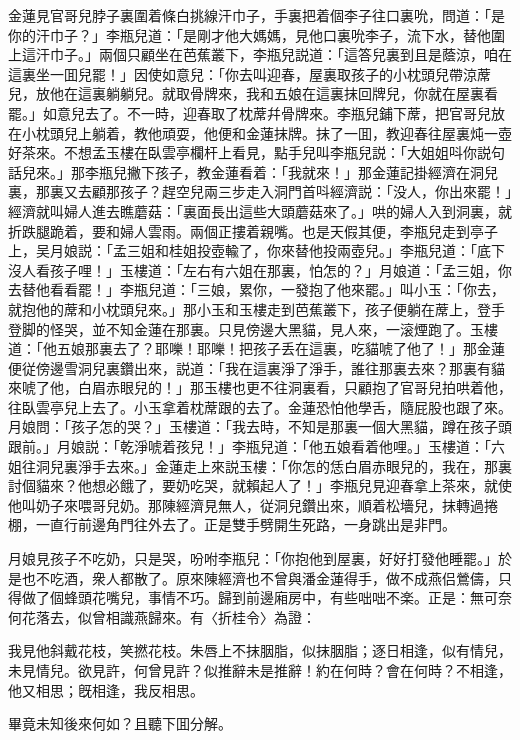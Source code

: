 金蓮見官哥兒脖子裏圍着條白挑線汗巾子，手裏把着個李子往口裏吮，問道：「是你的汗巾子？」李瓶兒道：「是剛才他大媽媽，見他口裏吮李子，流下水，替他圍上這汗巾子。」兩個只顧坐在芭蕉叢下，李瓶兒説道：「這答兒裏到且是蔭涼，咱在這裏坐一囬兒罷！」因使如意兒：「你去叫迎春，屋裏取孩子的小枕頭兒帶涼蓆兒，放他在這裏躺躺兒。就取骨牌來，我和五娘在這裏抹回牌兒，你就在屋裏看罷。」如意兒去了。不一時，迎春取了枕蓆幷骨牌來。李瓶兒鋪下蓆，把官哥兒放在小枕頭兒上躺着，教他頑耍，他便和金蓮抹牌。抹了一囬，教迎春往屋裏炖一壺好茶來。不想孟玉樓在臥雲亭欄杆上看見，點手兒叫李瓶兒説：「大姐姐呌你説句話兒來。」那李瓶兒撇下孩子，教金蓮看着：「我就來！」那金蓮記掛經濟在洞兒裏，那裏又去顧那孩子？趕空兒兩三步走入洞門首呌經濟説：「没人，你出來罷！」經濟就叫婦人進去瞧蘑菇：「裏面長出這些大頭蘑菇來了。」哄的婦人入到洞裏，就折跌腿跪着，要和婦人雲雨。兩個正摟着親嘴。也是天假其便，李瓶兒走到亭子上，吴月娘説：「孟三姐和桂姐投壺輸了，你來替他投兩壺兒。」李瓶兒道：「底下沒人看孩子哩！」玉樓道：「左右有六姐在那裏，怕怎的？」月娘道：「孟三姐，你去替他看看罷！」李瓶兒道：「三娘，累你，一發抱了他來罷。」叫小玉：「你去，就抱他的蓆和小枕頭兒來。」那小玉和玉樓走到芭蕉叢下，孩子便躺在蓆上，登手登脚的怪哭，並不知金蓮在那裏。只見傍邊大黑貓，見人來，一滚煙跑了。玉樓道：「他五娘那裏去了？耶嚛！耶嚛！把孩子丢在這裏，吃貓唬了他了！」那金蓮便従傍邊雪洞兒裏鑽出來，説道：「我在這裏淨了淨手，誰往那裏去來？那裏有貓來唬了他，白眉赤眼兒的！」那玉樓也更不往洞裏看，只顧抱了官哥兒拍哄着他，往臥雲亭兒上去了。小玉拿着枕蓆跟的去了。金蓮恐怕他學舌，隨屁股也跟了來。月娘問：「孩子怎的哭？」玉樓道：「我去時，不知是那裏一個大黑貓，蹲在孩子頭跟前。」月娘説：「乾淨唬着孩兒！」李瓶兒道：「他五娘看着他哩。」玉樓道：「六姐往洞兒裏淨手去來。」金蓮走上來説玉樓：「你怎的恁白眉赤眼兒的，我在，那裏討個貓來？他想必餓了，要奶吃哭，就賴起人了！」李瓶兒見迎春拿上茶來，就使他叫奶子來喂哥兒奶。那陳經濟見無人，従洞兒鑽出來，順着松墻兒，抹轉過捲棚，一直行前邊角門往外去了。正是雙手劈開生死路，一身跳出是非門。

月娘見孩子不吃奶，只是哭，吩咐李瓶兒：「你抱他到屋裏，好好打發他睡罷。」於是也不吃酒，衆人都散了。原來陳經濟也不曾與潘金蓮得手，做不成燕侣鶯儔，只得做了個蜂頭花嘴兒，事情不巧。歸到前邊廂房中，有些咄咄不楽。正是：無可奈何花落去，似曾相識燕歸來。有〈折桂令〉為證：

\begin{myquote}
我見他斜戴花枝，笑撚花枝。朱唇上不抹胭脂，似抹胭脂；逐日相逢，似有情兒，未見情兒。欲見許，何曾見許？似推辭未是推辭！約在何時？會在何時？不相逢，他又相思；旣相逢，我反相思。
\end{myquote}

畢竟未知後來何如？且聽下囬分解。

